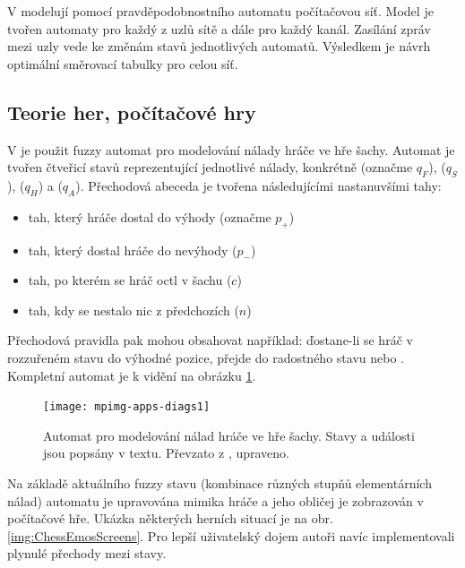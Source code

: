 V \cite{Niz-ModComComNetViaPrAu} modelují pomocí pravděpodobnostního automatu počítačovou síť. Model je tvořen automaty pro každý z uzlů sítě a dále pro každý kanál. Zasílání zpráv mezi uzly vede ke změnám stavů jednotlivých automatů. Výsledkem je návrh optimální směrovací tabulky pro celou síť.

\subsection{Teorie her, počítačové hry}
V \cite{AlvJoaCru-FuStMaAppEmoModEleGamCha} je použit fuzzy automat pro modelování nálady hráče ve hře šachy. Automat je tvořen čtveřicí stavů reprezentující jednotlivé  nálady, konkrétně  (označme $q_F$),  ($q_S$),  ($q_H$) a  ($q_A$). Přechodová abeceda je tvořena následujícími nastanuvšími tahy:
\begin{itemize}
 \item tah, který hráče dostal do výhody (označme $p_{+}$)
 \item tah, který dostal hráče do nevýhody ($p_{-}$)
 \item tah, po kterém se hráč octl v šachu ($c$)
 \item tah, kdy se nestalo nic z předchozích ($n$)
\end{itemize}

Přechodová pravidla pak mohou obsahovat například: \v{dostane-li se hráč v rozzuřeném stavu do výhodné pozice, přejde do radostného stavu} nebo . Kompletní automat je k vidění na obrázku \ref{img:ChessEmosFA}.

\begin{figure}
 \centering
 \texttt{[image: mpimg-apps-diags1]}
 
 \caption[Automat pro modelování nálad hráče ve hře šachy]{Automat pro modelování nálad hráče ve hře šachy. Stavy a události jsou popsány v textu. Převzato z \cite{AlvJoaCru-FuStMaAppEmoModEleGamCha}, upraveno.}
 \label{img:ChessEmosFA}
\end{figure}

Na základě aktuálního fuzzy stavu (kombinace různých stupňů elementárních nálad) automatu je upravována mimika hráče a jeho obličej je zobrazován v počítačové hře. Ukázka některých herních situací je na obr. \ref{img:ChessEmosScreens}. Pro lepší uživatelský dojem autoři navíc implementovali plynulé přechody mezi stavy.

